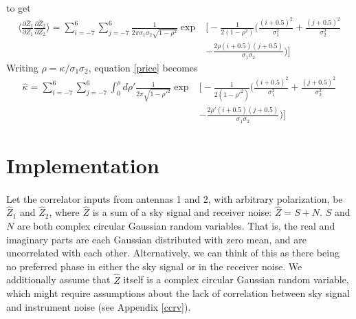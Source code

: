 \documentclass[11pt]{article}
\begin{document}
to get
\begin{equation}
\begin{split}
\Big\langle\frac{\partial \hat Z_1}{\partial Z_1}\frac{\partial \hat Z_2}{\partial Z_2}\Big\rangle=\sum_{i=-7}^{6}\sum_{j=-7}^{6}\frac{1}{2\pi\sigma_{1}\sigma_{2}\sqrt{1-\rho^2}}\exp&\Big[-\frac{1}{2(1-\rho^2)}\Big(\frac{(i+0.5)^2}{\sigma_1^2}+\frac{(j+0.5)^2}{\sigma_2^2}\\
&-\frac{2\rho (i+0.5)(j+0.5)}{\sigma_1\sigma_2}\Big)\Big]
\end{split}
\end{equation}
Writing $\rho=\kappa/\sigma_1\sigma_2$, equation \ref{price} becomes
\begin{equation}
\label{crosscorr}
\begin{split}
\hat\kappa=\sum_{i=-7}^{6}\sum_{j=-7}^{6}\int_0^\rho d{\rho'}\frac{1}{2\pi\sqrt{1-{\rho'}^2}}\exp&\Big[-\frac{1}{2(1-{\rho'}^2)}\Big(\frac{(i+0.5)^2}{\sigma_1^2}+\frac{(j+0.5)^2}{\sigma_2^2}\\
&-\frac{2{\rho'} (i+0.5)(j+0.5)}{\sigma_1\sigma_2}\Big)\Big]
\end{split}
\end{equation}
\section{Implementation}
\paragraph{}Let the correlator inputs from antennas 1 and 2, with arbitrary polarization, be $\hat Z_1$ and $\hat Z_2$, where $\hat Z$ is a sum of a sky signal and receiver noise: $\hat Z=S+N$. $S$ and $N$ are both complex circular Gaussian random variables. That is, the real and imaginary parts are each Gaussian distributed with zero mean, and are uncorrelated with each other. Alternatively, we can think of this as there being no preferred phase in either the sky signal or in the receiver noise. We additionally assume that $\hat Z$ itself is a complex circular Gaussian random variable, which might require assumptions about the lack of correlation between sky signal and instrument noise (see Appendix \ref{ccrv}). 
\end{document}
